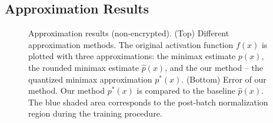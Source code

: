 \documentclass[conference]{IEEEtran}
\begin{document}
\subsection{Approximation Results}\label{sec:approx}

\begin{figure}[!htbp]
    \centering
    \caption{Approximation results (non-encrypted). (Top) Different approximation methods. The original activation function $f(x)$ is plotted with three approximations: the minimax estimate $p(x)$, the rounded minimax estimate $\hat{p}(x)$, and the our method -- the quantized minimax approximation $p^*(x)$. (Bottom) Error of our method. Our method $p^*(x)$ is compared to the baseline $\hat{p}(x)$. The blue shaded area corresponds to the post-batch normalization region during the training procedure.}
    \label{fig:approx}
\end{figure}
\end{document}
